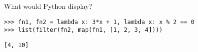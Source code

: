 \question What would Python display?

\begin{lstlisting}
>>> fn1, fn2 = lambda x: 3*x + 1, lambda x: x % 2 == 0
>>> list(filter(fn2, map(fn1, [1, 2, 3, 4])))
\end{lstlisting}
\begin{solution}[0.25in]
\begin{lstlisting}
[4, 10]
\end{lstlisting}
\end{solution}
